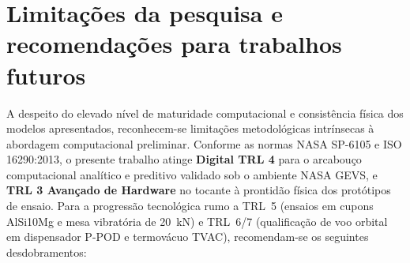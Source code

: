 \section{Limitações da pesquisa e recomendações para trabalhos futuros}
\label{sec:limitacoes}

A despeito do elevado nível de maturidade computacional e consistência física dos modelos apresentados, reconhecem-se limitações metodológicas intrínsecas à abordagem computacional preliminar. Conforme as normas NASA SP-6105 e ISO 16290:2013, o presente trabalho atinge \textbf{Digital TRL 4} para o arcabouço computacional analítico e preditivo validado sob o ambiente NASA GEVS, e \textbf{TRL 3 Avançado de Hardware} no tocante à prontidão física dos protótipos de ensaio. Para a progressão tecnológica rumo a TRL~5 (ensaios em cupons AlSi10Mg e mesa vibratória de \SI{20}{\kilo\newton}) e TRL~6/7 (qualificação de voo orbital em dispensador P-POD e termovácuo TVAC), recomendam-se os seguintes desdobramentos:

